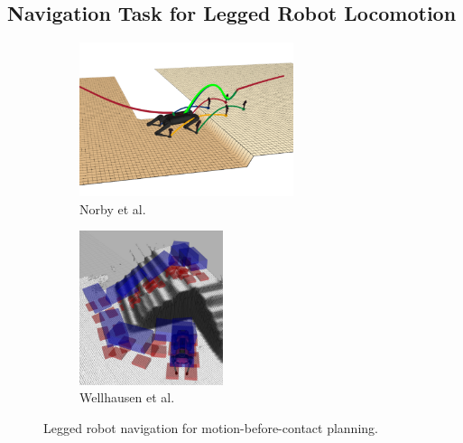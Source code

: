 \subsection{Navigation Task for Legged Robot Locomotion\label{subsub:nav:legged}}
\begin{figure}[h]
    \centering
    \captionsetup[subfigure]{justification=centering}
    \begin{subfigure}[t]{0.40\linewidth}
    \includegraphics[width=\textwidth,height=4.5cm]{Figures/Chapter_SOTA//norby_2022.png}
    \caption{Norby et al. \cite{norby_skd_2022}}
    \label{fig:legged_nav_0}
    \end{subfigure}
    \begin{subfigure}[t]{0.40\linewidth}
    \includegraphics[width=\textwidth,height=4.5cm]{Figures/Chapter_SOTA//hutter_guide_path.png}
    \caption{Wellhausen et al. \cite{rough_terrain_reachability_hutter_2021}}
    \label{fig:legged_nav_1}
    \end{subfigure}
    \caption{Legged robot navigation for motion-before-contact planning.}
\end{figure}




